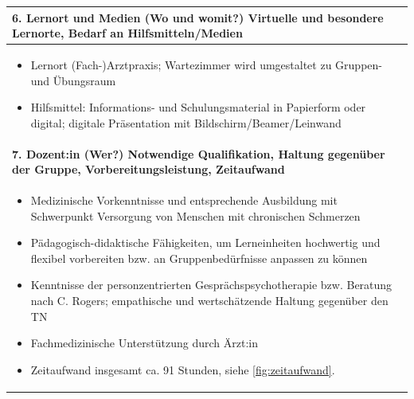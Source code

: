 \documentclass[
  twoside,
  parskip=half-,
  paper=176mm:246mm,
  BCOR=14mm,
  DIV=14,
]{scrreprt}
\begin{document}
\begin{center}
\begin{longtable}{p{}}
    \bfseries 6. Lernort und Medien (Wo und womit?) \newline
    Virtuelle und besondere Lernorte, Bedarf an Hilfsmitteln/Medien \\\hline
    \begin{itemize}[nosep, topsep=-10pt]
    \item Lernort (Fach-)Arztpraxis; Wartezimmer wird umgestaltet zu Gruppen- und Übungsraum
    \item Hilfsmittel: Informations- und Schulungsmaterial in Papierform oder digital; digitale Präsentation mit Bildschirm/Beamer/Leinwand 
    \end{itemize} \\\hline
    \bfseries 7. Dozent:in (Wer?) \newline
    Notwendige Qualifikation, Haltung gegenüber der Gruppe, Vorbereitungsleistung, Zeitaufwand \\\hline
    \begin{itemize}[nosep, topsep=-\parskip]
    \item Medizinische Vorkenntnisse und entsprechende Ausbildung mit Schwerpunkt Versorgung von Menschen mit chronischen Schmerzen
    \item Pädagogisch-didaktische Fähigkeiten, um Lerneinheiten hochwertig und flexibel vorbereiten bzw. an Gruppenbedürfnisse anpassen zu können
    \item Kenntnisse der personzentrierten Gesprächspsychotherapie bzw. Beratung nach C. Rogers; empathische und wertschätzende Haltung gegenüber den TN
    \item Fachmedizinische Unterstützung durch Ärzt:in
    \item Zeitaufwand insgesamt ca. 91 Stunden, siehe \autoref{fig:zeitaufwand}.
    \end{itemize} \\\hline
  \end{longtable}
\end{center}
\end{document}

